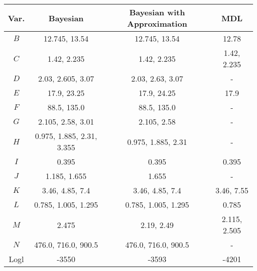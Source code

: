 \scriptsize
\begin{tabular}{cccc}
\toprule
Var. & Bayesian                  & Bayesian with Approximation & MDL          \\
\midrule
$B$    & 12.745, 13.54             & 12.745, 13.54               & 12.78        \\
$C$    & 1.42, 2.235               & 1.42, 2.235                 & 1.42, 2.235  \\
$D$    & 2.03, 2.605, 3.07         & 2.03, 2.63, 3.07            & -            \\
$E$    & 17.9, 23.25               & 17.9, 24.25                 & 17.9         \\
$F$    & 88.5, 135.0               & 88.5, 135.0                 & -            \\
$G$    & 2.105, 2.58, 3.01         & 2.105, 2.58                 & -            \\
$H$    & 0.975, 1.885, 2.31, 3.355 & 0.975, 1.885, 2.31          & -            \\
$I$    & 0.395                     & 0.395                       & 0.395        \\
$J$  & 1.185, 1.655              & 1.655                       & -            \\
$K$    & 3.46, 4.85, 7.4           & 3.46, 4.85, 7.4             & 3.46, 7.55   \\
$L$    & 0.785, 1.005, 1.295       & 0.785, 1.005, 1.295         & 0.785        \\
$M$    & 2.475                     & 2.19, 2.49                  & 2.115, 2.505 \\
$N$    & 476.0, 716.0, 900.5       & 476.0, 716.0, 900.5         & -            \\
\addlinespace[0.5em]
Logl & -3550                     & -3593                       & -4201        \\
\bottomrule
\end{tabular}